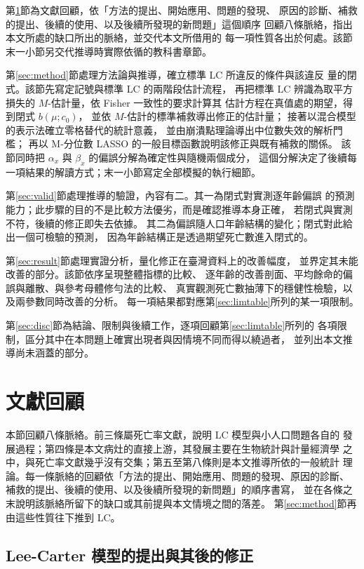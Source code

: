 \documentclass[UTF8, fontset=macnew, a4paper, 12pt]{ctexart}
\begin{document}
第\ref{sec:lit}節為文獻回顧，依「方法的提出、開始應用、問題的發現、
原因的診斷、補救的提出、後續的使用、以及後續所發現的新問題」這個順序
回顧八條脈絡，指出本文所處的缺口所出的脈絡，並交代本文所借用的
每一項性質各出於何處。該節末一小節另交代推導時實際依循的教科書章節。

第\ref{sec:method}節處理方法論與推導，確立標準 LC 所違反的條件與該違反
量的閉式。該節先寫定記號與標準 LC 的兩階段估計流程，
再把標準 LC 辨識為取平方損失的 $M$-估計量，依 Fisher 一致性的要求計算其
估計方程在真值處的期望，得到閉式 $b(\mu;c_0)$，
並依 $M$-估計的標準補救導出修正的估計量；
接著以混合模型的表示法確立零格替代的統計意義，
並由崩潰點理論導出中位數失效的解析門檻；
再以 M-分位數 LASSO 的一般目標函數說明該修正與既有補救的關係。
該節同時把 $\alpha_x$ 與 $\beta_x$ 的偏誤分解為確定性與隨機兩個成分，
這個分解決定了後續每一項結果的解讀方式；末一小節寫定全部模擬的執行細節。

第\ref{sec:valid}節處理推導的驗證，內容有二。其一為閉式對實測逐年齡偏誤
的預測能力；此步驟的目的不是比較方法優劣，而是確認推導本身正確，
若閉式與實測不符，後續的修正即失去依據。
其二為偏誤隨人口年齡結構的變化；閉式對此給出一個可檢驗的預測，
因為年齡結構正是透過期望死亡數進入閉式的。

第\ref{sec:result}節處理實證分析，量化修正在臺灣資料上的改善幅度，
並界定其未能改善的部分。該節依序呈現整體指標的比較、
逐年齡的改善剖面、平均餘命的偏誤與離散、與參考母體修勻法的比較、
真實觀測死亡數抽薄下的穩健性檢驗，以及兩參數同時改善的分析。
每一項結果都對應第\ref{sec:limtable}所列的某一項限制。

第\ref{sec:disc}節為結論、限制與後續工作，逐項回顧第\ref{sec:limtable}所列的
各項限制，區分其中在本問題上確實出現者與因情境不同而得以繞過者，
並列出本文推導尚未涵蓋的部分。
\section{文獻回顧}\label{sec:lit}

本節回顧八條脈絡。前三條屬死亡率文獻，說明 LC 模型與小人口問題各自的
發展過程；第四條是本文病灶的直接上游，其發展主要在生物統計與計量經濟學
之中，與死亡率文獻幾乎沒有交集；第五至第八條則是本文推導所依的一般統計
理論。每一條脈絡的回顧依「方法的提出、開始應用、問題的發現、原因的診斷、
補救的提出、後續的使用、以及後續所發現的新問題」的順序書寫，
並在各條之末說明該脈絡所留下的缺口或其前提與本文情境之間的落差。
第\ref{sec:method}節再由這些性質往下推到 LC。

\subsection{Lee-Carter 模型的提出與其後的修正}
\end{document}

